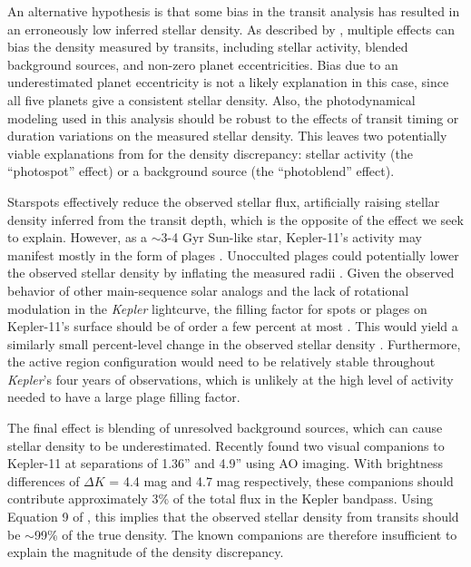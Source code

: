 \documentclass[twocolumn,trackchanges]{aastex61}
\newcommand{\Kepler}{\textit{Kepler} }
\begin{document}
An alternative hypothesis is that some bias in the transit analysis has resulted in an erroneously low inferred stellar density. As described by \citet{Kipping2014}, multiple effects can bias the density measured by transits, including stellar activity, blended background sources, and non-zero planet eccentricities. Bias due to an underestimated planet eccentricity is not a likely explanation in this case, since all five planets give a consistent stellar density. Also, the photodynamical modeling used in this analysis should be robust to the effects of transit timing or duration variations on the measured stellar density. This leaves two potentially viable explanations from \citet{Kipping2014} for the density discrepancy: stellar activity (the ``photospot'' effect) or a background source (the ``photoblend'' effect).

Starspots effectively reduce the observed stellar flux, artificially raising stellar density inferred from the transit depth, which is the opposite of the effect we seek to explain. However, as a $\sim$3-4 Gyr Sun-like star, Kepler-11's activity may manifest mostly in the form of plages \citep{Radick1998}. Unocculted plages could potentially lower the observed stellar density by inflating the measured radii \citep{Oshagh2014}. Given the observed behavior of other main-sequence solar analogs and the lack of rotational modulation in the \Kepler lightcurve, the filling factor for spots or plages on Kepler-11's surface should be of order a few percent at most \citep{Meunier2010}. This would yield a similarly small percent-level change in the observed stellar density \citep{Kipping2014}. Furthermore, the active region configuration would need to be relatively stable throughout \textit{Kepler}'s four years of observations, which is unlikely at the high level of activity needed to have a large plage filling factor.

The final effect is blending of unresolved background sources, which can cause stellar density to be underestimated. Recently \citet{Wang2015} found two visual companions to Kepler-11 at separations of 1.36'' and 4.9'' using AO imaging. With brightness differences of $\Delta K$ = 4.4 mag and 4.7 mag respectively, these companions should contribute approximately 3\% of the total flux in the Kepler bandpass. Using Equation 9 of \citet{Kipping2014}, this implies that the observed stellar density from transits should be $\sim$99\% of the true density. The known companions are therefore insufficient to explain the magnitude of the density discrepancy.
\end{document}
